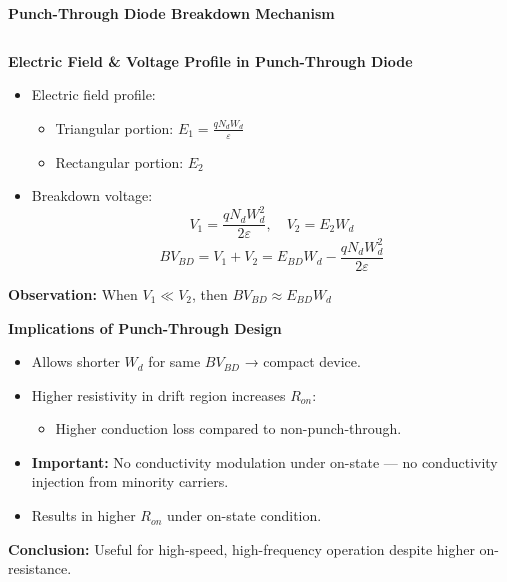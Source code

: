\begin{frame}{\textbf{Punch-Through Diode Breakdown Mechanism}}
\begin{columns}
    \end{columns}
\end{frame}


\begin{frame}{\textbf{Electric Field \& Voltage Profile in Punch-Through Diode}}
    \begin{itemize}
        \item Electric field profile:
        \begin{itemize}
            \item Triangular portion: $E_1 = \frac{qN_dW_d}{\varepsilon}$
            \item Rectangular portion: $E_2$
        \end{itemize}
        \item Breakdown voltage:
        \begin{equation}
            V_1 = \frac{qN_dW_d^2}{2\varepsilon}, \quad V_2 = E_2 W_d
        \end{equation}
        \begin{equation}
            BV_{BD} = V_1 + V_2 = E_{BD}W_d - \frac{qN_dW_d^2}{2\varepsilon}
        \end{equation}
    \end{itemize}
    \textbf{Observation:} When $V_1 \ll V_2$, then $BV_{BD} \approx E_{BD}W_d$
\end{frame}

\begin{frame}{\textbf{Implications of Punch-Through Design}}
    \begin{itemize}
        \item Allows shorter $W_d$ for same $BV_{BD}$ → compact device.
        \item Higher resistivity in drift region increases $R_{on}$:
        \begin{itemize}
            \item Higher conduction loss compared to non-punch-through.
        \end{itemize}
        \item \textbf{Important:} No conductivity modulation under on-state — no conductivity injection from minority carriers.
        \item Results in higher $R_{on}$ under on-state condition.
    \end{itemize}
    \textbf{Conclusion:} Useful for high-speed, high-frequency operation despite higher on-resistance.
\end{frame}

